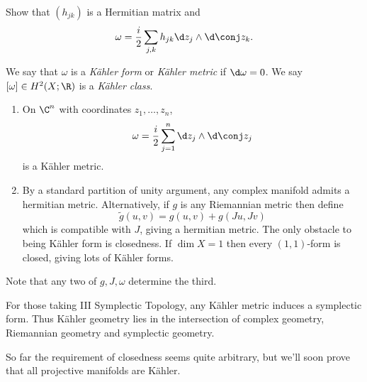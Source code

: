 \documentclass[a4paper]{article}
\newcommand{\w}{\wedge} %
\begin{document}
\begin{ex}
  Show that \((h_{jk})\) is a Hermitian matrix and
  \[
    \omega = \frac{i}{2} \sum_{j, k} h_{jk} \d z_j \w \d \conj z_k.
  \]
\end{ex}

\begin{definition}
  We say that \(\omega\) is a \emph{Kähler form} or \emph{Kähler metric} if \(\d \omega = 0\). We say \([\omega] \in H^2(X; \R)\) is a \emph{Kähler class}.
\end{definition}

\begin{eg}\leavevmode
  \begin{enumerate}
  \item On \(\C^n\) with coordinates \(z_1, \dots, z_n\),
    \[
      \omega = \frac{i}{2} \sum_{j = 1}^n \d z_j \w \d \conj z_j
    \]
    is a Kähler metric.
  \item By a standard partition of unity argument, any complex manifold admits a hermitian metric. Alternatively, if \(g\) is any Riemannian metric then define
    \[
      \tilde g(u, v) = g(u, v) + g(Ju, Jv)
    \]
    which is compatible with \(J\), giving a hermitian metric. The only obstacle to being Kähler form is closedness. If \(\dim X = 1\) then every \((1, 1)\)-form is closed, giving lots of Kähler forms.
  \end{enumerate}
\end{eg}

Note that any two of \(g, J, \omega\) determine the third.

\begin{remark}
  For those taking III Symplectic Topology, any Kähler metric induces a symplectic form. Thus Kähler geometry lies in the intersection of complex geometry, Riemannian geometry and symplectic geometry.
\end{remark}

So far the requirement of closedness seems quite arbitrary, but we'll soon prove that all projective manifolds are Kähler.
\end{document}
